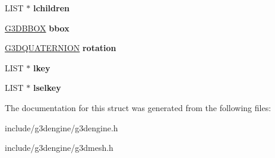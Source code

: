 \begin{DoxyCompactItemize}
\item 
\mbox{\label{struct__G3DOBJECT_a83da78eb00b0078532c6d6e3c50d52fa}} 
L\+I\+ST $\ast$ {\bfseries lchildren}
\item 
\mbox{\label{struct__G3DOBJECT_acc345e3a0ef55b5747e5217e3ee32d5d}} 
\hyperlink{struct__G3DBBOX}{G3\+D\+B\+B\+OX} {\bfseries bbox}
\item 
\mbox{\label{struct__G3DOBJECT_affa80beec690e6cc8c827b32a7269647}} 
\hyperlink{struct__G3DVECTOR}{G3\+D\+Q\+U\+A\+T\+E\+R\+N\+I\+ON} {\bfseries rotation}
\item 
\mbox{\label{struct__G3DOBJECT_a520b2fdf901c8bb213ea2aa305c2c868}} 
L\+I\+ST $\ast$ {\bfseries lkey}
\item 
\mbox{\label{struct__G3DOBJECT_a109f12a06d0df5ab098d3bd35bfd5307}} 
L\+I\+ST $\ast$ {\bfseries lselkey}
\end{DoxyCompactItemize}


The documentation for this struct was generated from the following files\+:\begin{DoxyCompactItemize}
\item 
include/g3dengine/g3dengine.\+h\item 
include/g3dengine/g3dmesh.\+h\end{DoxyCompactItemize}

